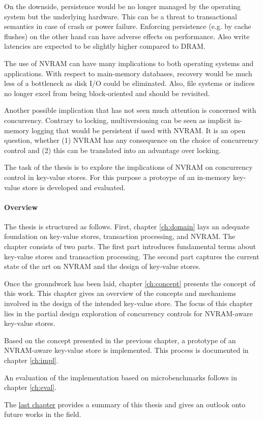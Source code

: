 On the downside, persistence would be no longer managed by the operating system
but the underlying hardware. This can be a threat to transactional semantics in
case of crash or power failure. Enforcing persistence (e.g. by cache flushes)
on the other hand can have adverse effects on performance. Also write 
latencies are expected to be slightly higher compared to DRAM.


The use of NVRAM can have many implications to both operating systems and
applications. With respect to main-memory databases, recovery would be much
less of a bottleneck as disk I/O could be eliminated. Also, file systems or 
indices no longer excel from being block-oriented and should be revisited.


Another possible implication that has not seen much attention is concerned with
concurrency. Contrary to locking, multiversioning can be seen as implicit
in-memory logging that would be persistent if used with NVRAM. It is an open
question, whether (1) NVRAM has any consequence on the choice of concurrency
control and (2) this can be translated into an advantage over locking.


The task of the thesis is to explore the implications of NVRAM on concurrency
control in key-value stores. For this purpose a protoype of an in-memory
key-value store is developed and evaluated.


\paragraph{Overview}

The thesis is structured as follows. First, chapter \ref{ch:domain} lays an 
adequate foundation on key-value stores, transaction processing, and NVRAM. 
The chapter consists of two parts. The first part introduces fundamental terms 
about key-value stores and transaction processing. The second part captures 
the current state of the art on NVRAM and the design of key-value stores.

Once the groundwork has been laid, chapter \ref{ch:concept} presents the 
concept of this work. This chapter gives an overview of the concepts and 
mechanisms involved in the design of the intended key-value store. The focus 
of this chapter lies in the partial design exploration of concurrency controls 
for NVRAM-aware key-value stores.

Based on the concept presented in the previous chapter, a prototype of an
NVRAM-aware key-value store is implemented. This process is documented in 
chapter \ref{ch:impl}.

An evaluation of the implementation based on microbenchmarks follows in 
chapter \ref{ch:eval}.

The \hyperref[ch:summary]{last chapter} provides a summary of this thesis and 
gives an outlook onto future works in the field.

